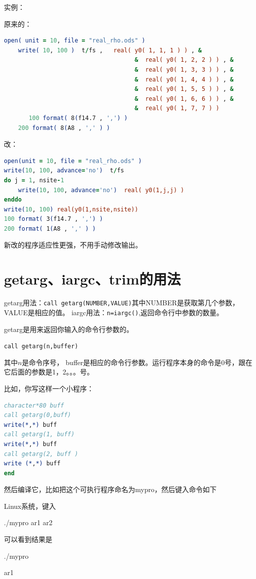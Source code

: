 实例：

原来的：
\begin{lstlisting}[language=Fortran]
	open( unit = 10, file = "real_rho.ods" )
	write( 10, 100 )  t/fs ,   real( y0( 1, 1, 1 ) ) , &
                                     &  real( y0( 1, 2, 2 ) ) , &
                                     &  real( y0( 1, 3, 3 ) ) , &
                                     &  real( y0( 1, 4, 4 ) ) , &
                                     &  real( y0( 1, 5, 5 ) ) , &
                                     &  real( y0( 1, 6, 6 ) ) , &
                                     &  real( y0( 1, 7, 7 ) )
       100 format( 8(f14.7 , ',') )
	200 format( 8(A8 , ',' ) )
\end{lstlisting}

改：
\begin{lstlisting}[language=Fortran]
open(unit = 10, file = "real_rho.ods" )
write(10, 100, advance='no')  t/fs
do j = 1, nsite-1
	write(10, 100, advance='no')  real( y0(1,j,j) ) 
enddo
write(10, 100) real(y0(1,nsite,nsite))
100 format( 3(f14.7 , ',') )
200 format( 1(A8 , ',' ) )
\end{lstlisting}
新改的程序适应性更强，不用手动修改输出。



\section{getarg、iargc、trim的用法}
getarg用法：\verb|call getarg(NUMBER,VALUE)|其中NUMBER是获取第几个参数，VALUE是相应的值。
iargc用法：\verb|n=iargc()|,返回命令行中参数的数量。

getarg是用来返回你输入的命令行参数的。

\verb|call getarg(n,buffer)|

其中$n$是命令序号， buffer是相应的命令行参数。运行程序本身的命令是0号，跟在它后面的参数是1，2。。。号。

比如，你写这样一个小程序：
\begin{lstlisting}[language=Fortran]
character*80 buff
call getarg(0,buff)
write(*,*) buff
call getarg(1, buff)
write(*,*) buff
call getarg(2, buff )
write (*,*) buff
end
\end{lstlisting}
然后编译它，比如把这个可执行程序命名为mypro，然后键入命令如下

Linux系统，键入

./mypro   ar1 ar2

可以看到结果是

./mypro

ar1

